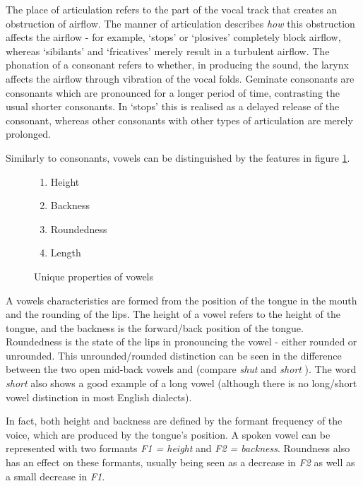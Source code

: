 \documentclass{report}
\begin{document}
	The place of articulation refers to the part of the vocal track that creates an obstruction of airflow. The manner of articulation describes \textit{how} this obstruction affects the airflow - for example, `stops' or `plosives' completely block airflow, whereas `sibilants' and `fricatives' merely result in a turbulent airflow. The phonation of a consonant refers to whether, in producing the sound, the larynx affects the airflow through vibration of the vocal folds. Geminate consonants are consonants which are pronounced for a longer period of time, contrasting the usual shorter consonants. In `stops' this is realised as a delayed release of the consonant, whereas other consonants with other types of articulation are merely prolonged.
	
	Similarly to consonants, vowels can be distinguished by the features in figure \ref{properties of vowels}.
	
	\begin{figure}[h]
		\caption{Unique properties of vowels}
		\label{properties of vowels}
		\begin{tcolorbox}
			\begin{enumerate}
				\item Height
				\item Backness
				\item Roundedness
				\item Length
			\end{enumerate}
		\end{tcolorbox}
	\end{figure}

	A vowels characteristics are formed from the position of the tongue in the mouth and the rounding of the lips. The height of a vowel refers to the height of the tongue, and the backness is the forward/back position of the tongue. Roundedness is the state of the lips in pronouncing the vowel - either rounded or unrounded. This unrounded/rounded distinction can be seen in the difference between the two open mid-back vowels  and  (compare \textit{shut}  and \textit{short} ). The word \textit{short}  also shows a good example of a long vowel (although there is no long/short vowel distinction in most English dialects).
	
	In fact, both height and backness are defined by the formant frequency of the voice, which are produced by the tongue's position. A spoken vowel can be represented with two formants \textit{F1 = height} and \textit{F2 = backness}. Roundness also has an effect on these formants, usually being seen as a decrease in \textit{F2} as well as a small decrease in \textit{F1}.
	
\end{document}

